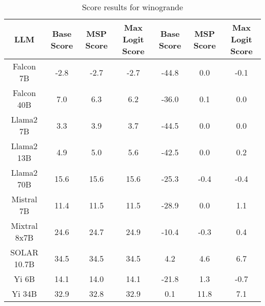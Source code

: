 \renewcommand\arraystretch{1.2}
\begin{table*}
\centering
\begin{tabular}{c|c|c|c|c|c|c}
LLM & Base Score & MSP Score & Max Logit Score & Base Score & MSP Score & Max Logit Score\\ \hline
Falcon 7B & -2.8 & -2.7 & -2.7 & -44.8 & 0.0 & -0.1\\
Falcon 40B & 7.0 & 6.3 & 6.2 & -36.0 & 0.1 & 0.0\\
Llama2 7B & 3.3 & 3.9 & 3.7 & -44.5 & 0.0 & 0.0\\
Llama2 13B & 4.9 & 5.0 & 5.6 & -42.5 & 0.0 & 0.2\\
Llama2 70B & 15.6 & 15.6 & 15.6 & -25.3 & -0.4 & -0.4\\
Mistral 7B & 11.4 & 11.5 & 11.5 & -28.9 & 0.0 & 1.1\\
Mixtral 8x7B & 24.6 & 24.7 & 24.9 & -10.4 & -0.3 & 0.4\\
SOLAR 10.7B & 34.5 & 34.5 & 34.5 & 4.2 & 4.6 & 6.7\\
Yi 6B & 14.1 & 14.0 & 14.1 & -21.8 & 1.3 & -0.7\\
Yi 34B & 32.9 & 32.8 & 32.9 & 0.1 & 11.8 & 7.1\\
\hline
\end{tabular}
\caption{Score results for winogrande}
\end{table*}
\label{tab:winogrande_score}
